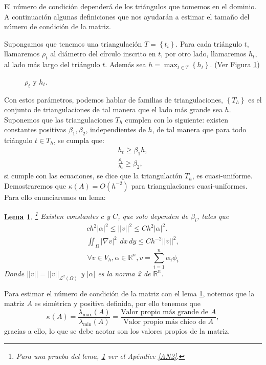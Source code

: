 \documentclass[12pt,spanish,oneside]{book}
\theoremstyle{plain}
\newtheorem{lema}[teo]{Lema}
\numberwithin{equation}{chapter}
\theoremstyle{definition}
\theoremstyle{remark}
\newcommand{\re}{\mathbb{R}}
\newcommand{\LD}{\mathcal{L}^2}
\newcommand{\dxy}{\hspace{5pt} dx\hspace{2pt} dy }
\newcommand{\intomega}[1]{\iint_\Omega #1 \dxy} %
\begin{document}
El número de condición dependerá de los triángulos que tomemos en el dominio. A continuación algunas definiciones que nos ayudarán a estimar el tamaño del número de condición de la matriz. 

Supongamos que tenemos una triangulación $T=\left \lbrace t_i\right\rbrace$. Para cada triángulo $t$, llamaremos $\rho_t$ al diámetro del círculo inscrito en $t$, por otro lado, llamaremos $h_t$, al lado más largo del triángulo $t$. Además sea $h=\max_{t\in T} \left\lbrace	h_t\right\rbrace$. (Ver Figura \ref{rhoh})

\begin{figure}[H]\label{rhoh}
\centering
{}
\caption{$\rho_t$ y $h_t$.}
\end{figure}

Con estos parámetros, podemos hablar de familias de triangulaciones, $\left\lbrace T_h\right \rbrace$ es el conjunto de triangulaciones de tal manera que el lado más grande sea $h$. Suponemos que las triangulaciones $T_h$ cumplen con lo siguiente: existen constantes positivas $\beta_1,\beta_2$, independientes de $h$, de tal manera que para todo triángulo $t\in T_h$, se cumpla que: 
\begin{eqnarray}
h_t\geq \beta_1h,\\
\frac{\rho_t}{h_t}\geq \beta_2,
\end{eqnarray}
si cumple con las ecuaciones, se dice que la triangulación $T_h$, es cuasi-uniforme. Demostraremos que $\kappa(A)=O(h^{-2})$ para triangulaciones cuasi-uniformes. Para ello enunciaremos un lema:
\begin{lema}\label{lemadesig}\footnote{Para una prueba del lema, \ref{lemadesig} ver el Apéndice \ref{AN2}.}
Existen constantes $c$ y $C$, que solo dependen de $\beta_i$, tales que
\begin{eqnarray}
ch^2|\alpha |^2\leq ||v||^2\leq Ch^2 |\alpha |^2.\label{desig1}\\
\intomega{|\nabla v|^2}\leq Ch^{-2}||v||^2, \label{desig2}
\end{eqnarray}
$$\forall v\in V_h, \alpha \in \re ^n, v = \sum_{i=1}^{n}\alpha_i \phi_i $$
Donde $||v||=||v||_{\LD(\Omega)}$ y $|\alpha| $ es la norma 2 de $\re^n$.
\end{lema}
Para estimar el número de condición de la matriz con el lema \ref{lemadesig}, notemos que la matriz $A$ es simétrica y positiva definida, por ello tenemos que \[\kappa(A)=\frac{\lambda_{\max}(A)}{\lambda_{\min}(A)}=\frac{\text{Valor propio m\'as grande de } A}{\text{Valor propio m\'as chico de } A },\]
gracias a ello, lo que se debe acotar son los valores propios de la matriz. 
\end{document}
